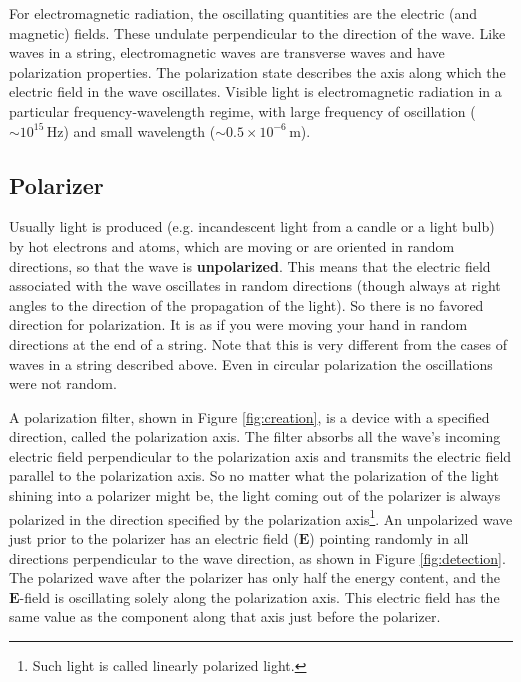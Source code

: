 For electromagnetic radiation, the oscillating quantities are the electric (and magnetic) fields. These undulate perpendicular to the direction of the wave. Like waves in a string, electromagnetic waves are transverse waves and have polarization properties. The polarization state describes the axis along which the electric field in the wave oscillates. Visible light is electromagnetic radiation in a particular frequency-wavelength regime, with large frequency of oscillation ($\sim 10^{15}\,\mathrm{Hz}$) and small wavelength ($\sim 0.5\times 10^{-6}\, \mathrm{m}$).\myskip

\subsection{Polarizer}
Usually light is produced (e.g. incandescent light from a candle or a light bulb) by hot electrons and atoms, which are moving or are oriented in random directions, so that the wave is \textbf{unpolarized}. This means that the electric field associated with the wave oscillates in random directions (though always at right angles to the direction of the propagation of the light). So there is no favored direction for polarization. It is as if you were moving your hand in random directions at the end of a string. Note that this is very different from the cases of waves in a string described above. Even in circular polarization the oscillations were not random.

A polarization filter, shown in Figure {\ref{fig:creation}}, is a device with a specified direction, called the polarization axis. The filter absorbs all the wave's incoming electric field perpendicular to the polarization axis and transmits the electric field parallel to the polarization axis. So no matter what the polarization of the light shining into a polarizer might be, the light coming out of the polarizer is always polarized in the direction specified by the polarization axis\footnote{Such light is called linearly polarized light.}. An unpolarized wave just prior to the polarizer has an electric field ($\mathbf{E}$) pointing randomly in all directions perpendicular to the wave direction, as shown in Figure {\ref{fig:detection}}. The polarized wave after the polarizer has only half the energy content, and the $\mathbf{E}$-field is oscillating solely along the polarization axis. This electric field has the same value as the component along that axis just before the polarizer.

